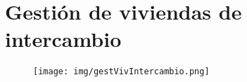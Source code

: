 \pagebreak
\section{Gestión de viviendas de intercambio}
\begin{figure}[!h]
  \centering
    \texttt{[image: img/gestVivIntercambio.png]}
    \caption{}
\end{figure}
